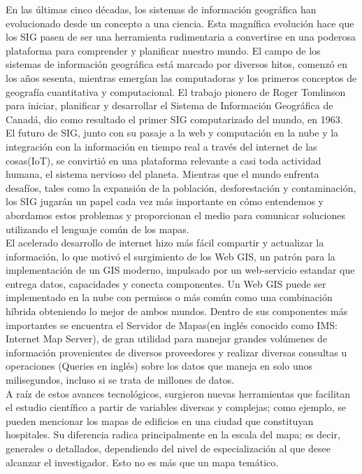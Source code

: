 En las \'ultimas cinco d\'ecadas, los sistemas de informaci\'on geogr\'afica han evolucionado desde un concepto a una ciencia. Esta magn\'ifica evoluci\'on hace que los SIG pasen de ser una herramienta rudimentaria a convertirse en una poderosa
plataforma para comprender y planificar nuestro mundo. El campo de los sistemas de informaci\'on geogr\'afica est\'a marcado por diversos hitos, comenz\'o en los a\~nos sesenta, mientras emerg\'ian las computadoras y los primeros conceptos de geograf\'ia cuantitativa y computacional. El trabajo pionero de Roger Tomlinson para iniciar, planificar y desarrollar el Sistema de Informaci\'on Geogr\'afica de Canad\'a, dio como resultado el primer SIG computarizado del mundo, en 1963.\\

El futuro de SIG, junto con su pasaje a la web y computaci\'on en la nube y la integraci\'on con la informaci\'on en tiempo real a trav\'es del internet de las cosas(IoT), se convirti\'o en una plataforma relevante a casi toda actividad humana, el sistema nervioso del planeta. Mientras que el mundo enfrenta desaf\'ios, tales como la expansi\'on de la poblaci\'on, desforestaci\'on y contaminaci\'on, los SIG \cite{FSIG} jugar\'an un papel cada vez m\'as importante en c\'omo entendemos y abordamos estos problemas y proporcionan el medio para comunicar soluciones utilizando el lenguaje com\'un de los mapas.\\

El acelerado desarrollo de internet hizo m\'as f\'acil compartir y actualizar la informaci\'on, lo que motiv\'o el surgimiento de los Web GIS, un patr\'on para la implementaci\'on de un GIS moderno, impulsado por un web-servicio estandar que entrega
datos, capacidades y conecta componentes. Un Web GIS puede ser implementado en la nube con permisos o m\'as com\'un como una combinaci\'on h\'ibrida obteniendo lo mejor de ambos mundos. Dentro de sus componentes m\'as importantes se encuentra el Servidor de Mapas(en ingl\'es conocido como IMS: Internet Map Server), de gran utilidad para manejar grandes vol\'umenes de informaci\'on provenientes de diversos proveedores y realizar diversas consultas u operaciones (Queries en ingl\'es) sobre los datos que maneja en solo unos milisegundos, incluso si se trata de millones de datos.\\

A ra\'iz de estos avances tecnol\'ogicos, surgieron nuevas herramientas que facilitan el estudio cient\'ifico a partir de variables diversas y complejas; como ejemplo, se pueden mencionar los mapas de edificios en una ciudad que constituyan hospitales. Su diferencia radica principalmente en la escala del mapa; es decir, generales o detallados, dependiendo del nivel de especializaci\'on al que desee alcanzar el investigador. Esto no es m\'as que un mapa tem\'atico.\\

